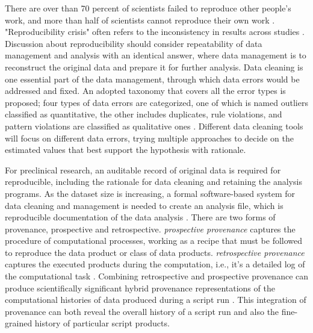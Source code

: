 There are over than 70 percent of scientists failed to reproduce other people's work, and more than half of scientists cannot reproduce their own work \cite{baker2016reproducibility}. "Reproducibility crisis" often refers to the inconsistency in results across studies \cite{samsa2019guide}. Discussion about reproducibility should consider repeatability of data management and analysis with an identical answer, where data management is to reconstruct the original data and prepare it for further analysis. Data cleaning is one essential part of the data management, through which data errors would be addressed and fixed. An adopted taxonomy that covers all the error types is proposed; four types of data errors are categorized, one of which is named outliers classified as quantitative, the other includes duplicates, rule violations, and pattern violations are classified as qualitative ones \cite{abedjan2016detecting}. Different data cleaning tools will focus on different data errors, trying multiple approaches to decide on the estimated values that best support the hypothesis with rationale.

For preclinical research, an auditable record of original data is required for reproducible, including the rationale for data cleaning and retaining the analysis programs. As the dataset size is increasing, a formal software-based system for data cleaning and management is needed to create an analysis file, which is reproducible documentation of the data analysis \cite{samsa2019guide}. 
There are two forms of provenance, prospective and retrospective. \textit{prospective provenance} captures the procedure of computational processes, working as a recipe that must be followed to reproduce the data product or class of data products. \textit{retrospective provenance} captures the executed products during the computation, i.e., it's a detailed log of the computational task \cite{freire2008provenance}. Combining retrospective and prospective provenance can produce scientifically significant hybrid provenance representations of the computational histories of data produced during a script run \cite{zhang2017revealing}. This integration of provenance can both reveal the overall history of a script run and also the fine-grained history of particular script products. 


